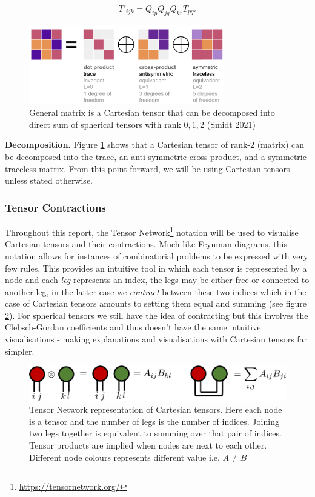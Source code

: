 \begin{equation} \label{eq:cart-trans}
    T'_{ijk} = Q_{ip}Q_{jq}Q_{kr}T_{pqr}
\end{equation}

\begin{figure}
    \centering
    \includegraphics[width=0.76\textwidth]{figures/decomp.png}
    \caption{General matrix is a Cartesian tensor that can be decomposed into direct sum of spherical tensors with rank $0,1,2$ (Smidt 2021) \cite{Smidt2021}}
    \label{fig:decomp}
\end{figure}

\textbf{Decomposition. } Figure \ref{fig:decomp} shows that a Cartesian tensor of rank-$2$ (matrix) can be decomposed into the trace, an anti-symmetric cross product, and a symmetric traceless matrix. From this point forward, we will be using Cartesian tensors unless stated otherwise.


\subsubsection{Tensor Contractions} 
Throughout this report, the Tensor Network\footnote{\url{https://tensornetwork.org/}} notation will be used to visualise Cartesian tensors and their contractions. Much like Feynman diagrams, this notation allows for instances of combinatorial problems to be expressed with very few rules. This provides an intuitive tool in which each tensor is represented by a node and each \textit{leg} represents an index, the legs may be either free or connected to another leg, in the latter case we \textit{contract} between these two indices which in the case of Cartesian tensors amounts to setting them equal and summing (see figure \ref{fig:tensor-net}). For spherical tensors we still have the idea of contracting but this involves the Clebsch-Gordan coefficients and thus doesn't have the same intuitive visualisations - making explanations and visualisations with Cartesian tensors far simpler. 

\begin{figure}[H]
    \centering
    \includegraphics[scale=0.3]{figures/tensor-net.png}
    \caption{Tensor Network representation of Cartesian tensors. Here each node is a tensor and the number of legs is the number of indices. Joining two legs together is equivalent to summing over that pair of indices. Tensor products are implied when nodes are next to each other. Different node colours represents different value i.e. $A \neq B$}
    \label{fig:tensor-net}
\end{figure}

